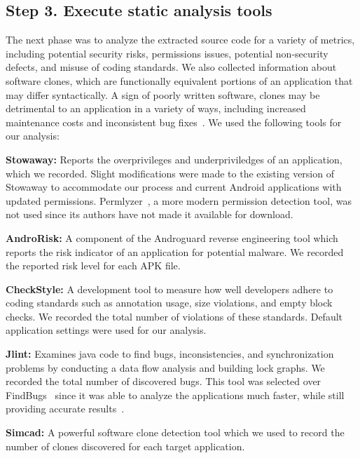 \subsection{Step 3. Execute static analysis tools}
\label{sec: analysis}

The next phase was to analyze the extracted source code for a variety of metrics, including potential security risks, permissions issues, potential non-security defects, and misuse of coding standards. We also collected information about software clones, which are functionally equivalent portions of an application that may differ syntactically. A sign of poorly written software, clones may be detrimental to an application in a variety of ways, including increased maintenance costs and inconsistent bug fixes~\cite{Roy:2009:CEC:1530898.1531101}. We used the following tools for our analysis:

 \textbf{Stowaway\cite{Felt:2011:APD:2046707.2046779}:} Reports the overprivileges and underpriviledges of an application, which we recorded. Slight modifications were made to the existing version of Stowaway to accommodate our process and current Android applications with updated permissions. Permlyzer~\cite{6698893}, a more modern permission detection tool, was not used since its authors have not made it available for download.

 \textbf{AndroRisk\cite{androguard_url}:} A component of the Androguard reverse engineering tool which reports the risk indicator of an application for potential malware. We recorded the reported risk level for each APK file.

 \textbf{CheckStyle\cite{checkstyle_key}:} A development tool to measure how well developers adhere to coding standards such as annotation usage, size violations, and empty block checks. We recorded the total number of violations of these standards. Default application settings were used for our analysis.

 \textbf{Jlint\cite{jlint_key}:} Examines java code to find bugs, inconsistencies, and synchronization problems by conducting a data flow analysis and building lock graphs. We recorded the total number of discovered bugs. This tool was selected over FindBugs~\cite{findbugs_key} since it was able to analyze the applications much faster, while still providing accurate results~\cite{rutar2004comparison}.

 \textbf{Simcad\cite{6613857}:} A powerful software clone detection tool which we used to record the number of clones discovered for each target application.

